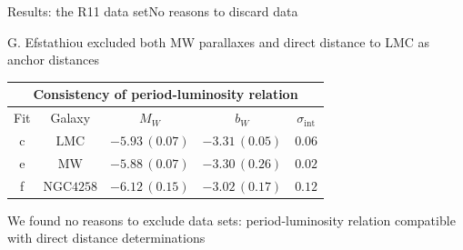 \documentclass{beamer}
\newcommand{\intt}{\mathrm{int}}
\newcommand{\LMC}{\mathrm{LMC}}
\newcommand{\MW}{\mathrm{MW}}
\newcommand{\NGC}{\mathrm{NGC4258}}
\begin{document}
\begin{frame}{Results: the R11 data set}{No reasons to discard data}

G. Efstathiou excluded both MW parallaxes and direct distance to LMC as anchor distances

\begin{table}[tbp]
\centering
\begin{tabular}{@{}ccccc}
\hline
\multicolumn{5}{c}{Consistency of period-luminosity relation} \\
\hline
Fit & Galaxy & $M_W$ & $b_W$ & $\sigma_{\intt}$ \\
\hline
 c & $\LMC$ & $-5.93\,(0.07)$& $-3.31\,(0.05)$& $0.06$  \\
 
 e & $\MW$ & $-5.88\,(0.07)$ & $-3.30\,(0.26)$ & $0.02$  \\
  
 f & $\NGC$ & $-6.12\,(0.15)$&$-3.02\,(0.17)$ & $0.12$  \\

\hline
\end{tabular}
\end{table}
We found no reasons to exclude data sets: period-luminosity relation compatible with direct distance determinations
\end{frame}
\end{document}
